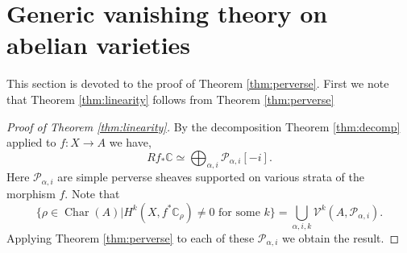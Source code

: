\documentclass[12pt,reqno]{amsart}
\theoremstyle{question}
\theoremstyle{definition}
\theoremstyle{remark}
\theoremstyle{cited}
\theoremstyle{citeddef}
\DeclareMathOperator{\Char}{Char}
\newcommand{\sP}{\mathcal{P}}
\newcommand\sV{{\mathcal V}}
\newcommand{\bbC}{\mathbb{C}}
\begin{document}
\section{Generic vanishing theory on abelian varieties}
This section is devoted to the proof of Theorem \ref{thm:perverse}. First we note that Theorem \ref{thm:linearity} follows
from Theorem \ref{thm:perverse}


\begin{proof}[Proof of Theorem \ref{thm:linearity}]
By the decomposition Theorem \ref{thm:decomp} applied to $f\colon X\to A$
we have, 
\[Rf_*\bbC\simeq \bigoplus_{\alpha,i} \sP_{\alpha,i}[-i].\]
Here $\sP_{\alpha, i}$ are simple perverse sheaves supported on various strata of the morphism $f$. 
Note that
\[\{\rho\in \Char(A)| H^k(X, f^*\bbC_{\rho})\neq 0 \text{ for some } k\} = \bigcup_{\alpha, i, k}\sV^k(A, \sP_{\alpha, i}).\]
Applying Theorem \ref{thm:perverse} to each 
of these $\sP_{\alpha,i}$ we obtain the result.
\end{proof}
\end{document}
